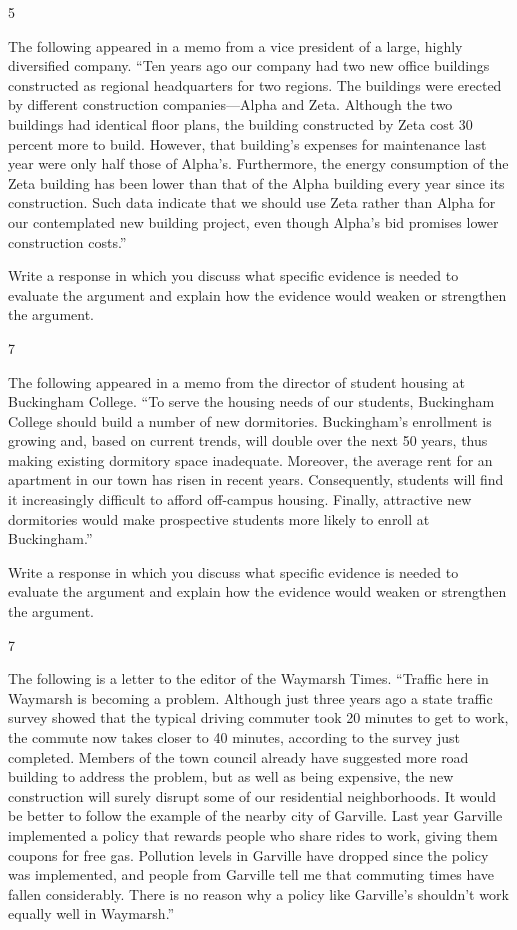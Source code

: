 \documentclass[]{article}
\begin{document}
5

The following appeared in a memo from a vice president of a large,
highly diversified company. ``Ten years ago our company had two new
office buildings constructed as regional headquarters for two regions.
The buildings were erected by different construction companies---Alpha
and Zeta. Although the two buildings had identical floor plans, the
building constructed by Zeta cost 30 percent more to build. However,
that building's expenses for maintenance last year were only half those
of Alpha's. Furthermore, the energy consumption of the Zeta building has
been lower than that of the Alpha building every year since its
construction. Such data indicate that we should use Zeta rather than
Alpha for our contemplated new building project, even though Alpha's bid
promises lower construction costs.''

Write a response in which you discuss what specific evidence is needed
to evaluate the argument and explain how the evidence would weaken or
strengthen the argument.

7

The following appeared in a memo from the director of student housing at
Buckingham College. ``To serve the housing needs of our students,
Buckingham College should build a number of new dormitories.
Buckingham's enrollment is growing and, based on current trends, will
double over the next 50 years, thus making existing dormitory space
inadequate. Moreover, the average rent for an apartment in our town has
risen in recent years. Consequently, students will find it increasingly
difficult to afford off-campus housing. Finally, attractive new
dormitories would make prospective students more likely to enroll at
Buckingham.''

Write a response in which you discuss what specific evidence is needed
to evaluate the argument and explain how the evidence would weaken or
strengthen the argument.

7

The following is a letter to the editor of the Waymarsh Times. ``Traffic
here in Waymarsh is becoming a problem. Although just three years ago a
state traffic survey showed that the typical driving commuter took 20
minutes to get to work, the commute now takes closer to 40 minutes,
according to the survey just completed. Members of the town council
already have suggested more road building to address the problem, but as
well as being expensive, the new construction will surely disrupt some
of our residential neighborhoods. It would be better to follow the
example of the nearby city of Garville. Last year Garville implemented a
policy that rewards people who share rides to work, giving them coupons
for free gas. Pollution levels in Garville have dropped since the policy
was implemented, and people from Garville tell me that commuting times
have fallen considerably. There is no reason why a policy like
Garville's shouldn't work equally well in Waymarsh.''
\end{document}
